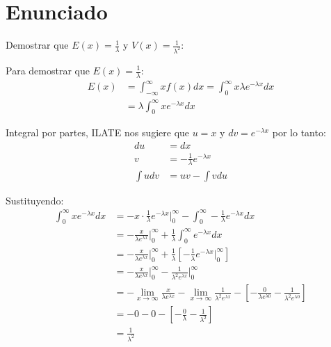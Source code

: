 \documentclass{templateNote}
\begin{document}
\portada
\margenes %

\section{Enunciado}
\indent
Demostrar que $E(x) = \displaystyle \frac{1}{\lambda}$ y $V(x) = \displaystyle \frac{1}{\lambda^2}$:

Para demostrar que $E(x) = \displaystyle \frac{1}{\lambda}$:
\begin{align*}
    E(x) &= \int_{- \infty}^{\infty} x f(x) dx = \int_{0}^{\infty} x \lambda e^{- \lambda x} dx \\
    &= \lambda \int_{0}^{\infty} x e^{- \lambda x} dx
\end{align*}

Integral por partes, ILATE nos sugiere que $u = x$ y $dv = e^{- \lambda x}$ por lo tanto:
\begin{align*}
    du &= dx \\
    v &= - \frac{1}{\lambda} e^{- \lambda x} \\
    \int{u dv} &= uv - \int v du
\end{align*}

Sustituyendo:
\begin{align*}
    \int_{0}^{\infty} x e^{- \lambda x} dx &= - x \cdot \frac{1}{\lambda} e^{- \lambda x} \Big|_{0}^{\infty} - \int_{0}^{\infty} - \frac{1}{\lambda} e^{- \lambda x} dx \\
    &= - \frac{x}{\lambda e^{\lambda x}} \Big|_{0}^{\infty} + \frac{1}{\lambda} \int_{0}^{\infty} e^{- \lambda x} dx \\
    &= - \frac{x}{\lambda e^{\lambda x}} \Big|_{0}^{\infty} + \frac{1}{\lambda} \left[- \frac{1}{\lambda} e^{- \lambda x} \Big|_{0}^{\infty}\right] \\
    &= - \frac{x}{\lambda e^{\lambda x}} \Big|_{0}^{\infty} - \frac{1}{\lambda^2 e^{\lambda x}} \Big|_{0}^{\infty} \\
    &= - \lim_{x \to \infty} \frac{x}{\lambda e^{\lambda x}} - \lim_{x \to \infty} \frac{1}{\lambda^2 e^{\lambda x}} - \left[- \frac{0}{\lambda e^{\lambda 0}} - \frac{1}{\lambda^2 e^{\lambda 0}}\right] \\
    &= - 0 - 0 - \left[- \frac{0}{\lambda} - \frac{1}{\lambda^2}\right] \\
    &= \frac{1}{\lambda^2}
\end{align*}
\end{document}
